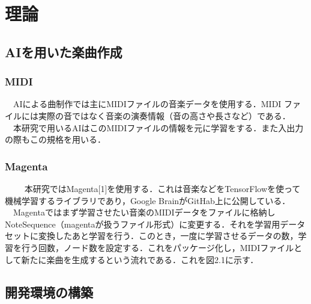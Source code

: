 \chapter{理論}
\section{AIを用いた楽曲作成}

\subsection{MIDI}

　AIによる曲制作では主にMIDIファイルの音楽データを使用する．MIDI ファイルには実際の音ではなく音楽の演奏情報（音の高さや長さなど）である．
　本研究で用いるAIはこのMIDIファイルの情報を元に学習をする．また入出力の際もこの規格を用いる．

\subsection{Magenta}
　
　本研究ではMagenta[1]を使用する．これは音楽などをTensorFlowを使って機械学習するライブラリであり，Google BrainがGitHab上に公開している．
　Magentaではまず学習させたい音楽のMIDIデータをファイルに格納しNoteSequence（magentaが扱うファイル形式）に変更する．それを学習用データセットに変換したあと学習を行う．このとき，一度に学習させるデータの数，学習を行う回数，ノード数を設定する．これをパッケージ化し，MIDIファイルとして新たに楽曲を生成するという流れである．これを図2.1に示す．

\section{開発環境の構築}

